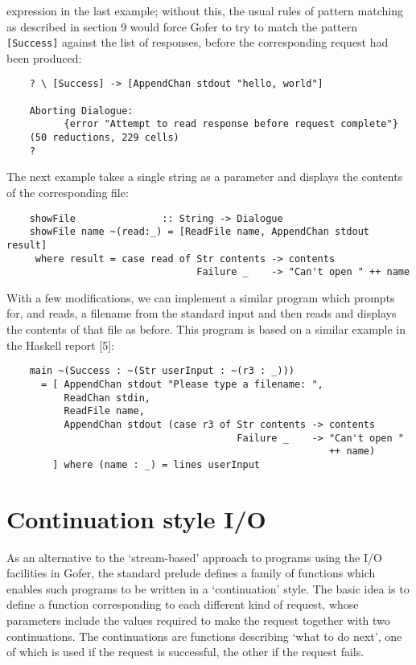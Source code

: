 expression in the last  example;  without  this,  the  usual  rules  of
pattern matching as described in section 9 would force Gofer to try  to
match the pattern \verb"[Success]" against the list of responses,  before  the
corresponding request had been produced:
\begin{verbatim}
    ? \ [Success] -> [AppendChan stdout "hello, world"]

    Aborting Dialogue:
          {error "Attempt to read response before request complete"}
    (50 reductions, 229 cells)
    ?
\end{verbatim}
The next example takes a single string as a parameter and displays  the
contents of the corresponding file:
\begin{verbatim}
    showFile               :: String -> Dialogue 
    showFile name ~(read:_) = [ReadFile name, AppendChan stdout result] 
     where result = case read of Str contents -> contents 
                                 Failure _    -> "Can't open " ++ name 
\end{verbatim}
With a few modifications, we can  implement  a  similar  program  which
prompts for, and reads, a filename from the  standard  input  and  then
reads and displays the contents of that file as before.   This  program
is based on a similar example in the Haskell report [5]:
\begin{verbatim}
    main ~(Success : ~(Str userInput : ~(r3 : _)))  
      = [ AppendChan stdout "Please type a filename: ", 
          ReadChan stdin, 
          ReadFile name, 
          AppendChan stdout (case r3 of Str contents -> contents
                                        Failure _    -> "Can't open "
                                                        ++ name)
        ] where (name : _) = lines userInput
\end{verbatim}




\section{Continuation style I/O}
As an alternative to the `stream-based' approach to programs using  the
I/O facilities in Gofer, the  standard  prelude  defines  a  family  of
functions which enables such programs to be written in a `continuation'
style.  The basic idea is to define a function  corresponding  to  each
different kind of request, whose parameters include the values required
to make the request together with two continuations.  The continuations
are functions describing `what to do next', one of which is used if the
request is successful, the other if the request fails.

